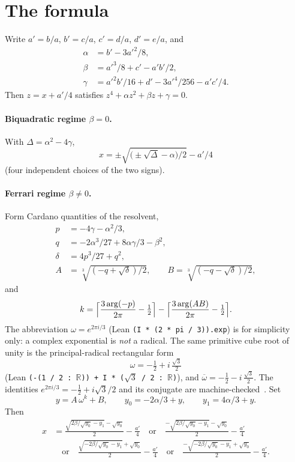 \documentclass[11pt,a4paper]{article}
\newcommand{\Arg}{\operatorname{arg}}
\begin{document}
\section{The formula}
\label{sec:formula}

Write \(a'=b/a\), \(b'=c/a\), \(c'=d/a\), \(d'=e/a\), and
\begin{align*}
\alpha&=b'-3a'^2/8,\\
\beta&=a'^3/8+c'-a'b'/2,\\
\gamma&=a'^2 b'/16+d'-3a'^4/256-a'c'/4.
\end{align*}
Then \(z=x+a'/4\) satisfies \(z^4+\alpha z^2+\beta z+\gamma=0\).

\paragraph{Biquadratic regime \(\beta=0\).}
With \(\Delta=\alpha^2-4\gamma\),
\[
x=\pm\sqrt{\bigl(\pm\sqrt{\Delta}-\alpha\bigr)/2}-a'/4
\]
(four independent choices of the two signs).

\paragraph{Ferrari regime \(\beta\neq 0\).}
Form Cardano quantities of the resolvent,
\begin{align*}
p&=-4\gamma-\alpha^2/3,\\
q&=-2\alpha^3/27+8\alpha\gamma/3-\beta^2,\\
\delta&=4p^3/27+q^2,\\
A&=\sqrt[3]{(-q+\sqrt{\delta})/2},\qquad
B=\sqrt[3]{(-q-\sqrt{\delta})/2},
\end{align*}
and
\[
k=\Bigl\lceil\frac{3\Arg(-p)}{2\pi}-\tfrac12\Bigr\rceil
-\Bigl\lceil\frac{3\Arg(AB)}{2\pi}-\tfrac12\Bigr\rceil.
\]
The abbreviation \(\omega=e^{2\pi i/3}\) (Lean \nolinkurl{(I * (2 * pi / 3)).exp}) is for simplicity only: a complex exponential is \emph{not} a radical.
The same primitive cube root of unity is the principal-radical rectangular form
\[
\omega=-\tfrac12+i\,\tfrac{\sqrt{3}}{2}
\]
(Lean \texttt{(-(1 / 2 : $\mathbb{R}$)) + I * ($\sqrt{3}$ / 2 : $\mathbb{R}$)}), and \(\overline{\omega}=-\tfrac12-i\,\tfrac{\sqrt{3}}{2}\).
The identities \(e^{2\pi i/3}=-\tfrac12+i\sqrt{3}/2\) and its conjugate are machine-checked~\cite{lemma_omega_rect,lemma_omega_conj}.
Set
\[
y=A\,\omega^{k}+B,\qquad
y_0=-2\alpha/3+y,\qquad
y_1=4\alpha/3+y.
\]
Then
\begin{align*}
x&=\frac{\sqrt{2\beta/\sqrt{y_0}-y_1}-\sqrt{y_0}}{2}-\frac{a'}{4}
\quad\text{or}\quad
\frac{-\sqrt{2\beta/\sqrt{y_0}-y_1}-\sqrt{y_0}}{2}-\frac{a'}{4}\\
&\quad\text{or}\quad
\frac{\sqrt{-2\beta/\sqrt{y_0}-y_1}+\sqrt{y_0}}{2}-\frac{a'}{4}
\quad\text{or}\quad
\frac{-\sqrt{-2\beta/\sqrt{y_0}-y_1}+\sqrt{y_0}}{2}-\frac{a'}{4}.
\end{align*}
\end{document}
